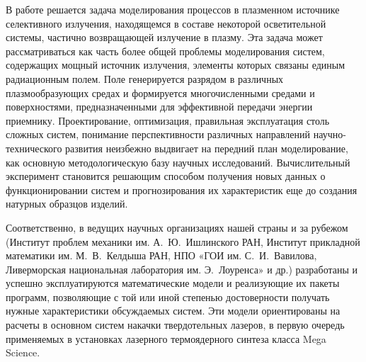 
В работе решается задача моделирования процессов в плазменном источнике селективного излучения, находящемся в составе  некоторой осветительной системы, частично возвращающей излучение в плазму.
Эта задача может рассматриваться как часть  более общей проблемы моделирования систем, содержащих мощный источник излучения, элементы которых связаны единым радиационным полем.
Поле генерируется разрядом в различных плазмообразующих средах и формируется многочисленными средами и поверхностями, предназначенными для эффективной передачи энергии приемнику.
Проектирование, оптимизация,  правильная эксплуатация столь сложных систем, понимание перспективности различных направлений  научно-технического  развития неизбежно выдвигает на передний план моделирование, как основную методологическую базу научных исследований.
Вычислительный эксперимент становится решающим способом получения новых данных о функционировании систем и прогнозирования их характеристик еще до создания натурных образцов изделий.

Соответственно, в ведущих научных организациях нашей страны и за рубежом (Институт проблем механики им. А.~Ю.~Ишлинского РАН, Институт прикладной математики им. М.~В.~Келдыша РАН, НПО «ГОИ им. С.~И.~Вавилова, Ливерморская национальная лаборатория им. Э.~Лоуренса» и др.) разработаны и успешно эксплуатируются математические модели и реализующие их пакеты программ, позволяющие с той или иной степенью достоверности получать нужные характеристики обсуждаемых систем.
Эти модели ориентированы на расчеты в основном систем накачки твердотельных лазеров, в первую очередь применяемых в установках лазерного термоядерного синтеза класса Mega Science.

